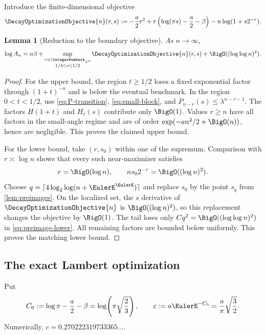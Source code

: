 \documentclass[11pt,oneside]{article}
\newtheorem{lemma}[theorem]{Lemma}
\theoremstyle{definition}
\theoremstyle{remark}
\begin{document}
Introduce the finite-dimensional objective
\begin{equation}
 \DecayOptimizationObjective{n}(r,s):=
 -\frac a2r^2
 +r\left(\log(\pi s)-\frac a2-\beta\right)
 -n\log(1+s2^{-r}).
 \label{eq:Fn}
\end{equation}

\begin{lemma}[Reduction to the boundary objective]
\label{lem:An-reduction}
As $n\to\infty$,
\begin{equation}
 \log A_n
 =n\beta+
 \sup_{\substack{r\in\IntegerNumbers_{\ge0}\\1/4\le s\le1/2}}
 \DecayOptimizationObjective{n}(r,s)
 +\BigO((\log\log n)^2).
 \label{eq:An-reduction}
\end{equation}
\end{lemma}

\begin{proof}
For the upper bound, the region $t\ge1/2$ loses a fixed exponential factor
through $(1+t)^{-n}$ and is below the eventual benchmark.  In the region
$0<t<1/2$, use \eqref{eq:P-transition}, \eqref{eq:small-block}, and
$P_{n-r}(s)\le\lambda^{n-r-1}$.  The factors $H(1+t)$ and $H_r(s)$ contribute
only $\BigO(1)$.  Values $r\ge n$ have all factors in the small-angle regime
and are of order $\exp(-an^2/2+\BigO(n))$, hence are negligible.  This proves
the claimed upper bound.

For the lower bound, take $(r,s_0)$ within one of the supremum.  Comparison
with $r\asymp\log n$ shows that every such near-maximizer satisfies
\begin{equation}
 r=\BigO(\log n),
 \qquad
 ns_02^{-r}=\BigO((\log n)^2).
 \label{eq:localization}
\end{equation}
Choose
$q=\lceil4\log_2\log(n+\EulerE^\EulerE)\rceil$ and replace $s_0$ by the point $s_q$
from \cref{lem:preimages}.  On the localized set, the $s$ derivative of
$\DecayOptimizationObjective{n}$ is $\BigO((\log n)^2)$, so this replacement changes the
objective by $\BigO(1)$.  The tail loses only
$Cq^2=\BigO((\log\log n)^2)$ in \eqref{eq:preimage-lower}.  All remaining
factors are bounded below uniformly.  This proves the matching lower bound.
\end{proof}

\subsection{The exact Lambert optimization}

Put
\begin{equation}
 C_0:=\log\pi-\frac a2-\beta
 =\log\!\left(\pi\sqrt{\frac23}\right),
 \qquad
 c:=a\EulerE^{-C_0}=\frac a\pi\sqrt{\frac32}.
 \label{eq:c-Lambert}
\end{equation}
Numerically, $c=0.270222319733365\ldots$.
\end{document}
